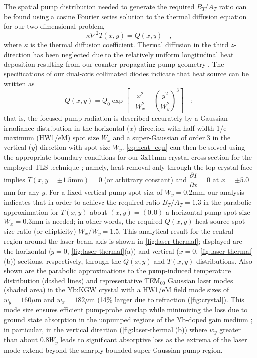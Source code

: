 The spatial pump distribution needed to generate the required $B_T/A_T$ ratio can be found using a cosine Fourier series solution to the thermal diffusion equation for our two-dimensional problem,
\begin{equation} \label{eq:heat_eqn}
  \kappa \nabla^2 T(x,y) = Q(x,y)
  \quad\text{,}
\end{equation}
where $\kappa$ is the thermal diffusion coefficient.
Thermal diffusion in the third $z$-direction has been neglected due to the relatively uniform longitudinal heat deposition resulting from our counter-propagating pump geometry \cite{Rimington_thermal_lens_2004}.
The specifications of our dual-axis collimated diodes \cite{website_limo} indicate that heat source can be written as
\begin{equation}
  Q(x,y) = Q_0 \exp \left[ - \frac{x^2}{W_x^2} - \left( \frac{y^2}{W_y^2} \right)^3 \right]
  \quad\text{;}
\end{equation}
that is, the focused pump radiation is described accurately by a Gaussian irradiance distribution in the horizontal ($x$) direction with half-width 1/e maximum (HW1/eM) spot size $W_x$ and a super-Gaussian of order 3 in the vertical ($y$) direction with spot size $W_y$.
\ref{eq:heat_eqn} can then be solved using the appropriate boundary conditions for our 3x10mm crystal cross-section for the employed TLS technique \cite{Rimington_thermal_lens_2004}; namely, heat removal only through the top crystal face implies $T(x,y = \pm 1.5\text{mm}) = 0$ (or arbitrary constant) and $\dfrac{\partial T}{\partial x} = 0$ at $ x = \pm 5.0$mm for any $y$.
For a fixed vertical pump spot size of $W_y = 0.2$mm, our analysis indicates that in order to achieve the required ratio $B_T / A_T = 1.3$ in the parabolic approximation for $T(x,y)$ about $(x,y) = (0,0)$ a horizontal pump spot size $W_x = 0.3$mm is needed; in other words, the required $Q(x,y)$ heat source spot size ratio (or ellipticity) $W_x / W_y = 1.5$.
This analytical result for the central region around the laser beam axis is shown in \ref{fig:laser-thermal}; displayed are the
horizontal ($y = 0$, \ref{fig:laser-thermal}(a)) and vertical ($x = 0$, \ref{fig:laser-thermal}(b)) sections, respectively, through the $Q(x,y)$ and $T(x,y)$ distributions.
Also shown are the parabolic approximations to the pump-induced temperature distribution (dashed lines) and representative TEM$_{00}$ Gaussian laser modes (shaded area) in the Yb:KGW crystal with a HW1/eM field mode sizes of $w_y = 160\mu$m and $w_x = 182 \mu$m (14\% larger due to refraction (\ref{fig:crystal}).
This mode size ensures efficient pump-probe overlap while minimizing the loss due to ground state absorption in the unpumped regions of the Yb-doped gain medium \cite{Brenier_new_criteria}; in particular, in the vertical direction (\ref{fig:laser-thermal}(b)) where $w_y$ greater than about $0.8 W_y$ leads to significant absorptive loss as the extrema of the laser mode extend beyond the sharply-bounded super-Gaussian pump region.

